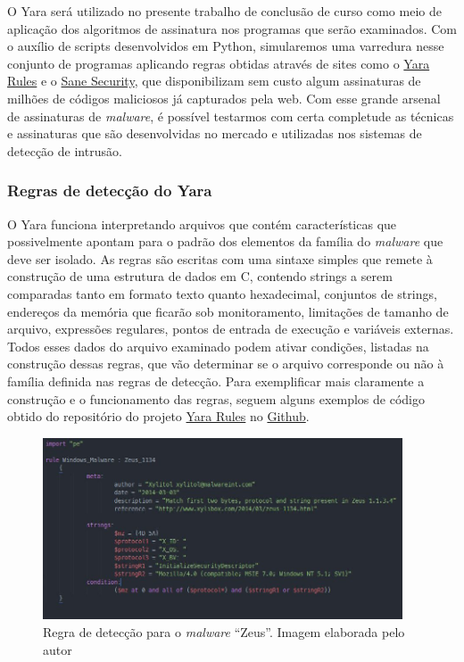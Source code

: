 O Yara será utilizado no presente trabalho de conclusão de curso como meio de
aplicação dos algoritmos de assinatura nos programas que serão examinados. Com
o auxílio de scripts desenvolvidos em Python, simularemos uma varredura nesse
conjunto de programas aplicando regras obtidas através de sites como o
\href{yararules.org}{Yara Rules} e o
\href{http://sanesecurity.com/usage/signatures/}{Sane Security}, que
disponibilizam sem custo algum assinaturas de milhões de códigos maliciosos já
capturados pela web. Com esse grande arsenal de assinaturas de \textit{malware}, é
possível testarmos com certa completude as técnicas e assinaturas que são
desenvolvidas no mercado e utilizadas nos sistemas de detecção de intrusão.

\subsubsection{Regras de detecção do Yara}
\label{l.regrasdyara}
O Yara funciona interpretando arquivos que contém características que possivelmente
apontam para o padrão dos elementos da família do \textit{malware} que deve ser
isolado. As regras são escritas com uma sintaxe simples que remete à
construção de uma estrutura de dados em C, contendo strings a serem comparadas
tanto em formato texto quanto hexadecimal, conjuntos de strings, endereços da
memória que ficarão sob monitoramento, limitações de tamanho de arquivo,
expressões regulares, pontos de entrada de execução e variáveis externas.
Todos esses dados do arquivo examinado podem ativar condições, listadas na
construção dessas regras, que vão determinar se o arquivo corresponde ou não à
família definida nas regras de detecção. Para exemplificar mais claramente a
construção e o funcionamento das regras, seguem alguns exemplos de código
obtido do repositório do projeto \href{yararules.org}{Yara Rules} no
\href{github.com}{Github}.

\begin{figure}[h]
	\centering
	\includegraphics[width=0.95\textwidth]{figs/zeus}
	\caption{Regra de detecção para o \textit{malware} ``Zeus''. Imagem elaborada pelo autor}
	\label{f.regrazeus}
\end{figure}

